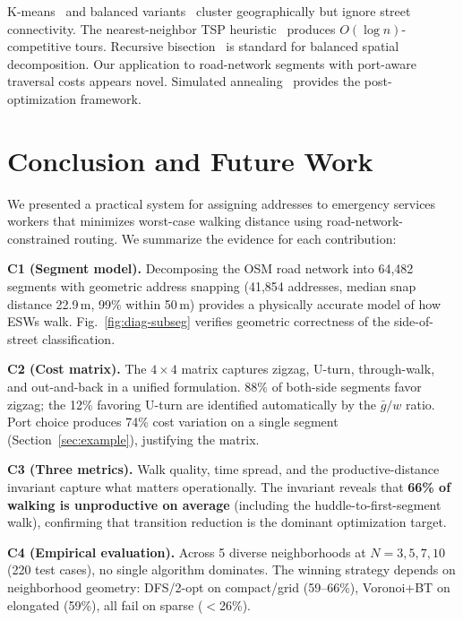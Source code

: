 \documentclass[conference]{IEEEtran}
\begin{document}
K-means~\cite{lloyd1982} and balanced variants~\cite{malinen2014} cluster geographically but ignore street connectivity. The nearest-neighbor TSP heuristic~\cite{rosenkrantz1977} produces $O(\log n)$-competitive tours. Recursive bisection~\cite{berger1987, karypis1998} is standard for balanced spatial decomposition. Our application to road-network segments with port-aware traversal costs appears novel. Simulated annealing~\cite{kirkpatrick1983} provides the post-optimization framework.

\section{Conclusion and Future Work}
\label{sec:conclusion}

We presented a practical system for assigning addresses to emergency services workers that minimizes worst-case walking distance using road-network-constrained routing. We summarize the evidence for each contribution:

\textbf{C1 (Segment model).} Decomposing the OSM road network into 64,482 segments with geometric address snapping (41,854 addresses, median snap distance 22.9\,m, 99\% within 50\,m) provides a physically accurate model of how ESWs walk. Fig.~\ref{fig:diag-subseg} verifies geometric correctness of the side-of-street classification.

\textbf{C2 (Cost matrix).} The $4 \times 4$ matrix captures zigzag, U-turn, through-walk, and out-and-back in a unified formulation. 88\% of both-side segments favor zigzag; the 12\% favoring U-turn are identified automatically by the $\bar{g}/w$ ratio. Port choice produces 74\% cost variation on a single segment (Section~\ref{sec:example}), justifying the matrix.

\textbf{C3 (Three metrics).} Walk quality, time spread, and the productive-distance invariant capture what matters operationally. The invariant reveals that \textbf{66\% of walking is unproductive on average} (including the huddle-to-first-segment walk), confirming that transition reduction is the dominant optimization target.

\textbf{C4 (Empirical evaluation).} Across 5 diverse neighborhoods at $N = 3, 5, 7, 10$ (220 test cases), no single algorithm dominates. The winning strategy depends on neighborhood geometry: DFS/2-opt on compact/grid (59--66\%), Voronoi+BT on elongated (59\%), all fail on sparse ($<$26\%).
\end{document}
